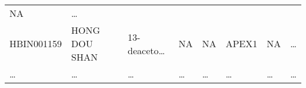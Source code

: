 \documentclass[
]{article}
\begin{document}
\begin{longtable}[]{@{}llllllll@{}}
\begin{minipage}[t]{0.11\columnwidth}
NA\strut
\end{minipage} & \begin{minipage}[t]{0.03\columnwidth}\raggedright
\ldots{}\strut
\end{minipage}\tabularnewline
\begin{minipage}[t]{0.11\columnwidth}\raggedright
HBIN001159\strut
\end{minipage} & \begin{minipage}[t]{0.11\columnwidth}\raggedright
HONG DOU SHAN\strut
\end{minipage} & \begin{minipage}[t]{0.14\columnwidth}\raggedright
13-deaceto\ldots{}\strut
\end{minipage} & \begin{minipage}[t]{0.14\columnwidth}\raggedright
NA\strut
\end{minipage} & \begin{minipage}[t]{0.08\columnwidth}\raggedright
NA\strut
\end{minipage} & \begin{minipage}[t]{0.09\columnwidth}\raggedright
APEX1\strut
\end{minipage} & \begin{minipage}[t]{0.11\columnwidth}\raggedright
NA\strut
\end{minipage} & \begin{minipage}[t]{0.03\columnwidth}\raggedright
\ldots{}\strut
\end{minipage}\tabularnewline
\begin{minipage}[t]{0.11\columnwidth}\raggedright
\ldots{}\strut
\end{minipage} & \begin{minipage}[t]{0.11\columnwidth}\raggedright
\ldots{}\strut
\end{minipage} & \begin{minipage}[t]{0.14\columnwidth}\raggedright
\ldots{}\strut
\end{minipage} & \begin{minipage}[t]{0.14\columnwidth}\raggedright
\ldots{}\strut
\end{minipage} & \begin{minipage}[t]{0.08\columnwidth}\raggedright
\ldots{}\strut
\end{minipage} & \begin{minipage}[t]{0.09\columnwidth}\raggedright
\ldots{}\strut
\end{minipage} & \begin{minipage}[t]{0.11\columnwidth}\raggedright
\ldots{}\strut
\end{minipage} & \begin{minipage}[t]{0.03\columnwidth}\raggedright
\ldots{}\strut
\end{minipage}\tabularnewline
\bottomrule
\end{longtable}
\end{document}
